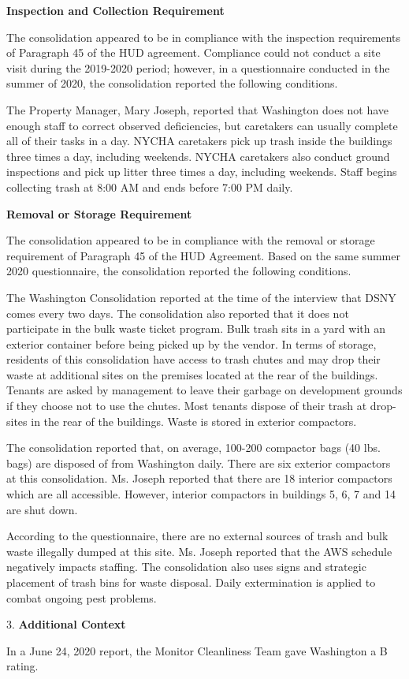 

\textbf{Inspection and Collection Requirement}

The consolidation appeared to be in compliance with the inspection requirements of Paragraph 45 of the HUD agreement. Compliance could not conduct a site visit during the 2019-2020 period; however, in a questionnaire conducted in the summer of 2020, the consolidation reported the following conditions.

The Property Manager, Mary Joseph, reported that Washington does not have enough staff to correct observed deficiencies, but caretakers can usually complete all of their tasks in a day. NYCHA caretakers pick up trash inside the buildings three times a day, including weekends. NYCHA caretakers also conduct ground inspections and pick up litter three times a day, including weekends. Staff begins collecting trash at 8:00 AM  and ends before 7:00 PM daily. 

\textbf{Removal or Storage Requirement}

The consolidation appeared to be in compliance with the  removal or storage requirement of Paragraph  45 of the HUD Agreement. Based on the same summer 2020 questionnaire, the consolidation reported the following conditions.

The Washington Consolidation reported at the time of the interview that DSNY comes every two days. The consolidation also reported that it does not participate in the bulk waste ticket program. Bulk trash sits in a yard with an exterior container before being picked up by the vendor. In terms of storage, residents of this consolidation have access to trash chutes and may drop their waste at additional sites on the premises located at the rear of the buildings. Tenants are asked by management to leave their garbage on development grounds if they choose not to use the chutes. Most tenants dispose of their trash at drop-sites in the rear of the buildings. Waste is stored in exterior compactors. 

The consolidation reported that, on average, 100-200 compactor bags (40 lbs. bags) are disposed of from Washington daily. There are six exterior compactors at this consolidation. Ms. Joseph reported that there are 18 interior compactors which are all accessible. However, interior compactors in buildings 5, 6, 7 and 14 are shut down.

According to the questionnaire, there are no external sources of trash and bulk waste illegally dumped at this site. Ms. Joseph reported that the AWS schedule negatively impacts staffing. The consolidation also uses signs and strategic placement of trash bins for waste disposal. Daily extermination is applied to combat ongoing pest problems.

3. \textbf{Additional Context}

In a June 24, 2020 report, the Monitor Cleanliness Team gave Washington a B rating. 